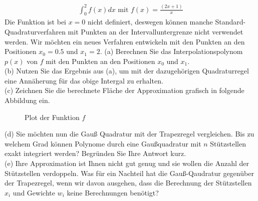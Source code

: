 \documentclass{scrartcl}
\begin{document}
\begin{align*}
\int_{0}^{2} f(x) dx \text{ mit } f(x) = \frac{(2x + 1)}{x}
\end{align*}
Die Funktion ist bei $x=0$ nicht definiert, deswegen können manche Standard-Quadraturverfahren mit Punkten an der Intervalluntergrenze nicht verwendet werden. Wir möchten ein neues Verfahren entwickeln mit den Punkten an den Positionen $x_0 = 0.5$ und $x_1 = 2$.
\n 
(a)
Berechnen Sie das Interpolationspolynom $p(x)$ von $f$ mit den Punkten an den Positionen $x_0$ und $x_1$.
\lbreak \lbreak
\\
(b)
Nutzen Sie das Ergebnis aus (a), um mit der dazugehörigen Quadraturregel eine Annäherung für das obige Intergal zu erhalten.
\lbreak \lbreak
\\
(c) 
Zeichnen Sie die berechnete Fläche der Approximation grafisch in folgende Abbildung ein.
\begin{figure}[ht]
	\centering
	\caption{Plot der Funktion $f$}
\end{figure}
\newpage
\noindent(d) 
Sie möchten nun die Gauß Quadratur mit der Trapezregel vergleichen. Bis zu welchem Grad können Polynome durch eine Gaußquadratur mit $n$ Stützstellen exakt integriert werden? Begründen Sie Ihre Antwort kurz.
\lbreak \lbreak
\\
(e) 
Ihre Approximation ist Ihnen nicht gut genug und sie wollen die Anzahl der Stützstellen verdoppeln. Was für ein Nachteil hat die Gauß-Qaudratur gegenüber der Trapezregel, wenn wir davon ausgehen, dass die Berechnung der Stützstellen $x_i$ und Gewichte $w_i$ keine Berechnungen benötigt?


\end{document}
